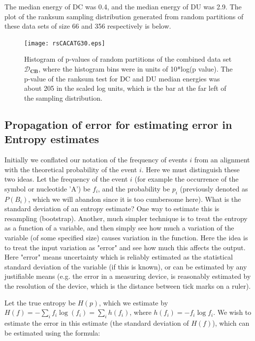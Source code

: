 The median energy of DC was 0.4, and the median energy of DU was 2.9.  The plot of the ranksum sampling distribution generated from random partitions of these data sets of size 66 and 356 respectively is below.
\begin{figure}[!htbp]
 \texttt{[image: rsCACATG30.eps]}\\
  \caption{ Histogram of p-values of random partitions of the combined data set $\mathcal D_{\textbf{CB}}$, where the histogram bins were in units of 10*log(p value).  The p-value of the ranksum test for DC and DU median energies was about 205 in the scaled log units, which is the bar at the far left of the sampling distribution. }
\end{figure}\label{bb}
\newpage
\subsection{Propagation of error for estimating error in Entropy estimates }
Initially we conflated our notation of the frequency of events $i$ from an alignment with the theoretical probability of the event $i$.  Here we must distinguish these two ideas.  Let the frequency of the event $i$ (for example the occurrence of the symbol or nucleotide 'A') be $f_i$, and the probability be $p_i$ (previously denoted as $P(B_i)$, which we will abandon since it is too cumbersome here).  What is the standard deviation of an entropy estimate?  One way to estimate this is resampling (bootstrap).  Another, much simpler technique is to treat the entropy as a function of a variable, and then simply see how much a variation of the variable (of some specified size) causes variation in the function.  Here the idea is to treat the input variation as "error" and see how much this affects the output.  
Here "error" means uncertainty which is reliably estimated as the statistical standard deviation of the variable (if this is known), or can be estimated by any justifiable means (e.g. the error in a measuring device, is reasonably estimated by the resolution of the device, which is the distance between tick marks on a ruler).  

Let the true entropy be $H(p)$, which we estimate by $H(f)=-\sum_i f_i\log(f_i) =\sum_i h(f_i)$, where $h(f_i)=-f_i\log{f_i}$.  We wish to estimate the error in this estimate (the standard deviation of $H(f)$), which can be estimated using the formula:

